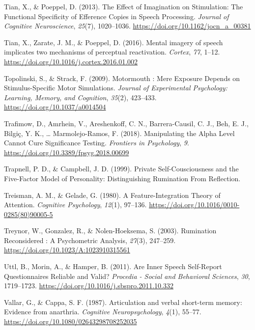 \documentclass[a4paper,12pt,twoside,openright,oldfontcommands,final]{memoir}
\begin{document}
\leavevmode\hypertarget{ref-tian_effect_2013}{}%
Tian, X., \& Poeppel, D. (2013). The Effect of Imagination on Stimulation: The Functional Specificity of Efference Copies in Speech Processing. \emph{Journal of Cognitive Neuroscience}, \emph{25}(7), 1020--1036. \url{https://doi.org/10.1162/jocn_a_00381}

\leavevmode\hypertarget{ref-tian_mental_2016}{}%
Tian, X., Zarate, J. M., \& Poeppel, D. (2016). Mental imagery of speech implicates two mechanisms of perceptual reactivation. \emph{Cortex}, \emph{77}, 1--12. \url{https://doi.org/10.1016/j.cortex.2016.01.002}

\leavevmode\hypertarget{ref-topolinski_motormouth_2009}{}%
Topolinski, S., \& Strack, F. (2009). Motormouth : Mere Exposure Depends on Stimulus-Specific Motor Simulations. \emph{Journal of Experimental Psychology: Learning, Memory, and Cognition}, \emph{35}(2), 423--433. \url{https://doi.org/10.1037/a0014504}

\leavevmode\hypertarget{ref-trafimow_manipulating_2018}{}%
Trafimow, D., Amrhein, V., Areshenkoff, C. N., Barrera-Causil, C. J., Beh, E. J., Bilgiç, Y. K., \ldots{} Marmolejo-Ramos, F. (2018). Manipulating the Alpha Level Cannot Cure Significance Testing. \emph{Frontiers in Psychology}, \emph{9}. \url{https://doi.org/10.3389/fpsyg.2018.00699}

\leavevmode\hypertarget{ref-trapnell_private_1999}{}%
Trapnell, P. D., \& Campbell, J. D. (1999). Private Self-Cousciousness and the Five-Factor Model of Personality: Distinguishing Rumination From Reflection.

\leavevmode\hypertarget{ref-treisman_feature-integration_1980}{}%
Treisman, A. M., \& Gelade, G. (1980). A Feature-Integration Theory of Attention. \emph{Cognitive Psychology}, \emph{12}(1), 97--136. \url{https://doi.org/10.1016/0010-0285(80)90005-5}

\leavevmode\hypertarget{ref-treynor_rumination_2003}{}%
Treynor, W., Gonzalez, R., \& Nolen-Hoeksema, S. (2003). Rumination Reconsidered : A Psychometric Analysis, \emph{27}(3), 247--259. \url{https://doi.org/10.1023/A:1023910315561}

\leavevmode\hypertarget{ref-Uttl2011}{}%
Uttl, B., Morin, A., \& Hamper, B. (2011). Are Inner Speech Self-Report Questionnaires Reliable and Valid? \emph{Procedia - Social and Behavioral Sciences}, \emph{30}, 1719--1723. \url{https://doi.org/10.1016/j.sbspro.2011.10.332}

\leavevmode\hypertarget{ref-vallar_articulation_1987}{}%
Vallar, G., \& Cappa, S. F. (1987). Articulation and verbal short-term memory: Evidence from anarthria. \emph{Cognitive Neuropsychology}, \emph{4}(1), 55--77. \url{https://doi.org/10.1080/02643298708252035}
\end{document}
